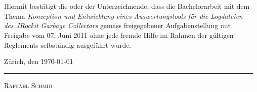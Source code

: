 \newpage
\thispagestyle{empty}
\section*{}
\vspace{15mm}    %

Hiermit bestätigt die oder der Unterzeichnende, dass die Bachelorarbeit mit dem Thema \textit{Konzeption und Entwicklung eines Auswertungstools für die Logdateien des JRockit Garbage Collectors} gemäss freigegebener Aufgabenstellung mit Freigabe vom 07. Juni 2011 ohne jede fremde Hilfe im Rahmen der gültigen Reglements selbständig ausgeführt
wurde.
 
\vspace{20mm}
Zürich, den \today
\vspace{20mm}


\rule[-0.2cm]{5cm}{0.5pt}


\textsc{Raffael Schmid} 